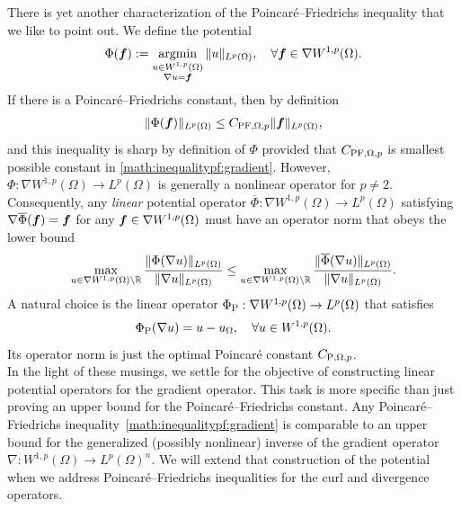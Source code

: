 \documentclass[10pt,a4paper]{article}
\begin{document}
There is yet another characterization of the Poincar\'e--Friedrichs inequality that we like to point out. 
We define the potential 
\begin{align*}
    \Phi( \bm{f} ) := \operatorname*{{\rm argmin}}\limits_{ \substack{ u \in W^{1,p}(\Omega) \\ \nabla u = \bm{f} } } \| u \|_{L^{p}(\Omega)},
    \quad 
    \forall 
    \bm{f} \in \nabla W^{1,p}(\Omega)
    .
\end{align*}
If there is a Poincar\'e--Friedrichs constant, then by definition
\begin{align*}
    \| \Phi(\bm{f}) \|_{L^{p}(\Omega)} \leq C_{{\rm PF},\Omega,p} \| \bm{f} \|_{L^{p}(\Omega)},
\end{align*}
and this inequality is sharp by definition of $\Phi$ provided that $C_{{\rm PF},\Omega,p}$ is smallest possible constant in \eqref{math:inequalitypf:gradient}. 
However, $\Phi : \nabla W^{1,p}(\Omega) \rightarrow L^{p}(\Omega)$ is generally a nonlinear operator for $p \neq 2$. 
Consequently, any \textit{linear} potential operator $\overline\Phi : \nabla W^{1,p}(\Omega) \rightarrow L^{p}(\Omega)$
satisfying $\nabla \overline\Phi( \bm{f} ) = \bm{f}$ for any $\bm{f} \in \nabla W^{1,p}(\Omega)$ must have an operator norm that obeys the lower bound 
\begin{align*}
    \max\limits_{ u \in \nabla W^{1,p}(\Omega) \setminus {\mathbb R} } 
    \frac{ \| \Phi(\nabla u) \|_{L^{p}(\Omega)} }{ \| \nabla u \|_{L^{p}(\Omega)} }
    \leq 
    \max\limits_{ u \in \nabla W^{1,p}(\Omega) \setminus {\mathbb R} } 
    \frac{ \| \overline\Phi(\nabla u) \|_{L^{p}(\Omega)} }{ \| \nabla u \|_{L^{p}(\Omega)} }
    .
\end{align*}
A natural choice is the linear operator $\Phi_{{\rm P}} : \nabla W^{1,p}(\Omega) \rightarrow L^{p}(\Omega)$ that satisfies 
\begin{align*}
    \Phi_{{\rm P}}( \nabla u ) = u - u_{\Omega},
    \quad 
    \forall 
    u \in W^{1,p}(\Omega)
    .
\end{align*}
Its operator norm is just the optimal Poincar\'e constant $C_{{\rm P},\Omega,p}$.
\\

In the light of these musings, we settle for the objective of constructing linear potential operators for the gradient operator.
This task is more specific than just proving an upper bound for the Poincar\'e--Friedrichs constant. 
Any Poincar\'e--Friedrichs inequality~\eqref{math:inequalitypf:gradient} is comparable to an upper bound for the generalized (possibly nonlinear) inverse of the gradient operator $\nabla : W^{1,p}(\Omega) \rightarrow L^{p}(\Omega)^{n}$. 
We will extend that construction of the potential when we address Poincar\'e--Friedrichs inequalities for the curl and divergence operators. 
\end{document}
